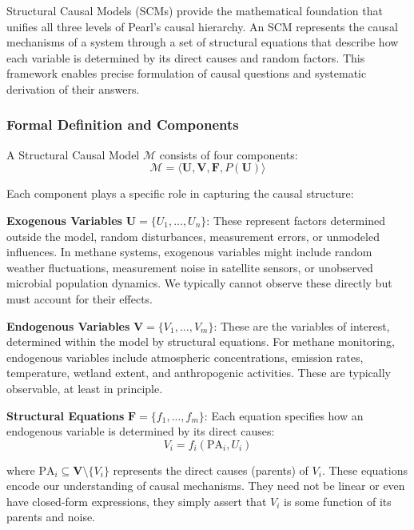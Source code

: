 Structural Causal Models (SCMs) provide the mathematical foundation that unifies all three levels of Pearl's causal hierarchy. An SCM represents the causal mechanisms of a system through a set of structural equations that describe how each variable is determined by its direct causes and random factors. This framework enables precise formulation of causal questions and systematic derivation of their answers.

\subsubsection{Formal Definition and Components}

A Structural Causal Model $\mathcal{M}$ consists of four components:
\begin{equation}
\mathcal{M} = \langle \mathbf{U}, \mathbf{V}, \mathbf{F}, P(\mathbf{U}) \rangle
\end{equation}

Each component plays a specific role in capturing the causal structure:

\textbf{Exogenous Variables} $\mathbf{U} = \{U_1, ..., U_n\}$: These represent factors determined outside the model, random disturbances, measurement errors, or unmodeled influences. In methane systems, exogenous variables might include random weather fluctuations, measurement noise in satellite sensors, or unobserved microbial population dynamics. We typically cannot observe these directly but must account for their effects.

\textbf{Endogenous Variables} $\mathbf{V} = \{V_1, ..., V_m\}$: These are the variables of interest, determined within the model by structural equations. For methane monitoring, endogenous variables include atmospheric concentrations, emission rates, temperature, wetland extent, and anthropogenic activities. These are typically observable, at least in principle.

\textbf{Structural Equations} $\mathbf{F} = \{f_1, ..., f_m\}$: Each equation specifies how an endogenous variable is determined by its direct causes:
\begin{equation}
V_i = f_i(\text{PA}_i, U_i)
\end{equation}

where $\text{PA}_i \subseteq \mathbf{V} \setminus \{V_i\}$ represents the direct causes (parents) of $V_i$. These equations encode our understanding of causal mechanisms. They need not be linear or even have closed-form expressions, they simply assert that $V_i$ is some function of its parents and noise.

